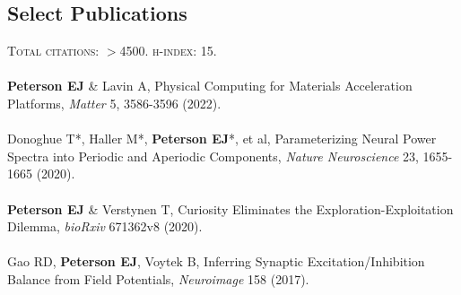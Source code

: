 \documentclass[margin,line]{res}
\begin{document}
\begin{resume}
\section{\sc Select Publications}
\textsc{Total citations}: $>$4500. \textsc{h-index}: 15.
\\ 
\vspace{-.4cm} 
\\
\textbf{Peterson EJ} \& Lavin A, Physical Computing for Materials Acceleration Platforms, \textit{Matter} 5, 3586-3596 (2022).
\\ 
\vspace{-.4cm} 
\\
Donoghue T*, Haller M*, \textbf{Peterson EJ}*, et al, Parameterizing Neural Power Spectra into Periodic and Aperiodic Components, \emph{Nature Neuroscience} 23, 1655-1665 (2020). 
\\ 
\vspace{-.4cm} 
\\
\textbf{Peterson EJ} \& Verstynen T, Curiosity Eliminates the Exploration-Exploitation Dilemma, \emph{bioRxiv} 671362v8 (2020). 
\\
\vspace{-.4cm} 
\\
Gao RD, \textbf{Peterson EJ}, Voytek B, Inferring Synaptic Excitation/Inhibition Balance from Field Potentials, \emph{Neuroimage} 158 (2017).

\end{resume}
\end{document}
